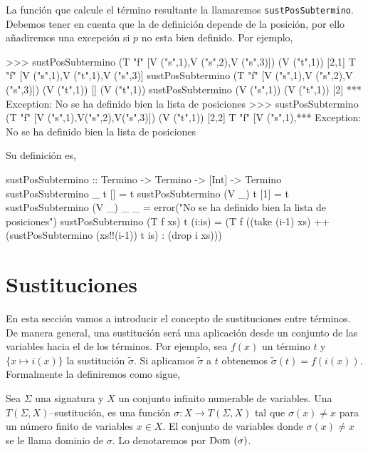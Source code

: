 La función que calcule el término resultante la llamaremos
\texttt{sustPosSubtermino}. Debemos tener en cuenta que la de
definición depende de la posición, por ello añadiremos una excepción
si $p$ no esta bien definido. Por ejemplo,

\begin{sesion}
>>> sustPosSubtermino (T "f" [V ("s",1),V ("s",2),V ("s",3)]) 
                        (V ("t",1)) [2,1]
T "f" [V ("s",1),V ("t",1),V ("s",3)]
sustPosSubtermino (T "f" [V ("s",1),V ("s",2),V ("s",3)]) 
                  (V ("t",1)) []
(V ("t",1))
sustPosSubtermino (V ("s",1)) (V ("t",1)) [2]
*** Exception: No se ha definido bien la lista de posiciones
>>> sustPosSubtermino (T "f" [V ("s",1),V("s",2),V("s",3)]) 
                        (V ("t",1)) [2,2]
T "f" [V ("s",1),*** Exception: No se ha definido bien la 
                     lista de posiciones
\end{sesion}

Su definición es,

\begin{codigo}
sustPosSubtermino :: Termino -> Termino -> [Int] -> Termino
sustPosSubtermino _ t [] = t
sustPosSubtermino (V _) t [1] = t
sustPosSubtermino (V _) _ _ = error("No se ha definido bien la 
                                     lista de posiciones")
sustPosSubtermino (T f xs) t (i:is) = (T f
    ((take (i-1) xs) ++
    (sustPosSubtermino (xs!!(i-1)) t is) :
    (drop i xs)))
\end{codigo}

\section {Sustituciones}

En esta sección vamos a introducir el concepto de sustituciones entre
términos. De manera general, una sustitución será una aplicación desde
un conjunto de las variables hacia el de los términos. Por ejemplo,
sea $f(x)$ un término $t$ y $\{x \mapsto i(x) \}$ la sustitución
$\tilde{\sigma}$. Si aplicamos $\tilde{\sigma}$ a $t$ obtenemos
$\tilde{\sigma}(t) = f(i(x))$. Formalmente la definiremos como sigue,

\begin{defi} 
  Sea $\Sigma$ una signatura y $X$ un conjunto infinito numerable de
  variables. Una $T(\Sigma, X)$--sustitución, es una función
  $\sigma : X \rightarrow T(\Sigma, X)$ tal que $\sigma(x) \neq x$
  para un número finito de variables $x \in X$. El conjunto de
  variables donde $\sigma(x) \neq x$ se le llama dominio de
  $\sigma$. Lo denotaremos por $\mbox{Dom } (\sigma)$.
\end{defi}


